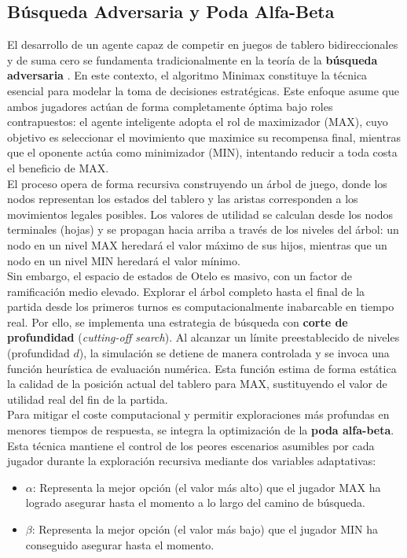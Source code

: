 \documentclass[conference]{IEEEtran}
\begin{document}
\subsection{Búsqueda Adversaria y Poda Alfa-Beta}
El desarrollo de un agente capaz de competir en juegos de tablero bidireccionales y de suma cero se fundamenta tradicionalmente en la 
teoría de la \textbf{búsqueda adversaria} \cite{russell}. En este contexto, 
el algoritmo Minimax constituye la técnica esencial para modelar la toma de decisiones estratégicas. 
Este enfoque asume que ambos jugadores 
actúan de forma completamente óptima bajo roles contrapuestos: el agente 
inteligente adopta el rol de maximizador (MAX), cuyo objetivo es seleccionar el movimiento que maximice su recompensa final, mientras que el oponente 
actúa como minimizador (MIN), intentando reducir a toda costa el beneficio de MAX.\\

El proceso opera de forma recursiva construyendo un árbol de juego, donde los nodos representan los estados del tablero y las aristas corresponden a los 
movimientos legales posibles. Los valores de utilidad se calculan desde los nodos terminales (hojas) y se propagan hacia arriba a través de los niveles 
del árbol: un nodo en un nivel MAX heredará el valor máximo de sus hijos, mientras que un nodo en un nivel MIN heredará el valor mínimo.\\

Sin embargo, el espacio de estados de Otelo es masivo, con un factor de ramificación medio elevado. Explorar el árbol completo hasta el final de la partida 
desde los primeros turnos es computacionalmente inabarcable en tiempo real. Por ello, se implementa una estrategia de búsqueda con \textbf{corte de profundidad} (\textit{cutting-off search}). 
Al alcanzar un límite preestablecido de niveles (profundidad $d$), la simulación se detiene de manera controlada y se invoca una función heurística de evaluación numérica. Esta 
función estima de forma estática la calidad de la posición actual del tablero para MAX, sustituyendo el valor de utilidad real del fin de la partida.\\

Para mitigar el coste computacional y permitir exploraciones más profundas en menores tiempos de respuesta, se integra la optimización de la \textbf{poda alfa-beta}. 
Esta técnica mantiene el control de los peores escenarios asumibles por cada jugador durante la exploración recursiva mediante dos variables adaptativas:
\begin{itemize}
    \item $\alpha$: Representa la mejor opción (el valor más alto) que el jugador MAX ha logrado asegurar hasta el momento a lo largo del camino de búsqueda.
    \item $\beta$: Representa la mejor opción (el valor más bajo) que el jugador MIN ha conseguido asegurar hasta el momento.
\end{itemize}
\end{document}
